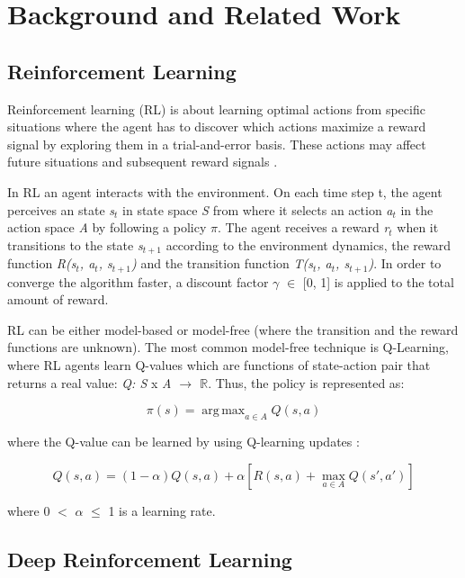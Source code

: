 \documentclass{llncs}
\DeclareMathOperator*{\argmax}{arg\,max}
\begin{document}
\section{Background and Related Work}

\subsection{Reinforcement Learning}

Reinforcement learning (RL) is about learning optimal actions from specific situations where the agent has to discover which actions maximize a reward signal by exploring them in a trial-and-error basis. These actions may affect future situations and subsequent reward signals \cite{RichardS.SuttonandAndrewG.Barto2018}.

In RL an agent interacts with the environment. On each time step t, the agent perceives an state \textit{s$_{t}$} in state space \textit{S} from where it selects an action \textit{a$_{t}$} in the action space \textit{A} by following a policy \textit{$\pi$}. The agent receives a reward \textit{r$_{t}$} when it transitions to the state \textit{s$_{t+1}$} according to the environment dynamics, the reward function  \textit{R(s$_{t}$, a$_{t}$, s$_{t+1}$)} and the transition function \textit{T(s$_{t}$, a$_{t}$, s$_{t+1}$)}. In order to converge the algorithm faster, a discount factor $\gamma$ $\in$ [0, 1] is applied to the total amount of reward.

RL can be either model-based or model-free (where the transition and the reward functions are unknown). The most common model-free technique is Q-Learning, where RL agents learn Q-values which are functions of state-action pair that returns a real value: \textit{Q: S} x \textit{A $\rightarrow$ $\mathbb{R}$}. Thus, the policy is represented as:

\begin{equation}
\pi(s) = \argmax_{a \in A} Q(s, a)
\end{equation}

where the Q-value can be learned by using Q-learning updates \cite{Watkins1992}:

\begin{equation}
Q(s, a) = (1 - \alpha)Q(s, a) + \alpha[R(s, a) + \max_{a \in A}Q(s', a')]
\end{equation}

where 0 $<$ $\alpha$ $\leq$ 1 is a learning rate.


\subsection{Deep Reinforcement Learning}
\end{document}
